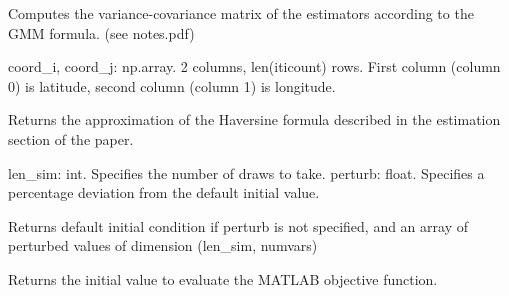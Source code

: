 \documentclass[letterpaper,10pt,english]{sphinxmanual}
\begin{document}
\begin{fulllineitems}

\begin{fulllineitems}
\label{\detokenize{index:estimate.Estimate.get_variance_gmm}}
Computes the variance-covariance matrix of the estimators according to
the GMM formula. (see notes.pdf)

\end{fulllineitems}


\begin{fulllineitems}
\label{\detokenize{index:estimate.Estimate.haversine_approx}}
coord\_i, coord\_j: np.array. 2 columns, len(iticount) rows. First column
(column 0) is latitude, second column (column 1) is longitude.

Returns the approximation of the Haversine formula described in the
estimation section of the paper.

\end{fulllineitems}


\begin{fulllineitems}
\label{\detokenize{index:estimate.Estimate.initial_cond}}
len\_sim: int. Specifies the number of draws to take.
perturb: float. Specifies a percentage deviation from the default
initial value.

Returns default initial condition if perturb is not specified, and an
array of perturbed values of dimension (len\_sim, numvars)

\end{fulllineitems}


\begin{fulllineitems}
\label{\detokenize{index:estimate.Estimate.output_to_jhwi}}
Returns the initial value to evaluate the MATLAB objective function.

\end{fulllineitems}


\end{fulllineitems}
\end{document}
